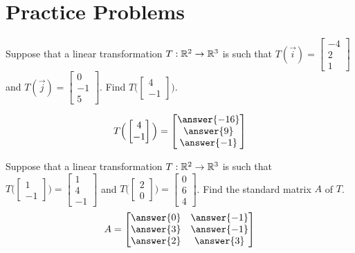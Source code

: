 \documentclass{ximera}
\begin{document}


\section*{Practice Problems}
\begin{problem}\label{prob:evaluateT}
Suppose that a linear transformation $T:\mathbb{R}^2\rightarrow\mathbb{R}^3$ is such that  $T(\vec{i})=\begin{bmatrix}-4\\2\\1\end{bmatrix}$ and $T(\vec{j})=\begin{bmatrix}0\\-1\\5\end{bmatrix}$.  Find $T\Big(\begin{bmatrix}4\\-1\end{bmatrix}\Big)$.

$$T\Big(\begin{bmatrix}4\\-1\end{bmatrix}\Big)=\begin{bmatrix}\answer{-16}\\\answer{9}\\\answer{-1}\end{bmatrix}$$
\end{problem}

\begin{problem}\label{prob:standardmatrix}
Suppose that a linear transformation $T:\mathbb{R}^2\rightarrow\mathbb{R}^3$ is such that  $T\Big(\begin{bmatrix}1\\-1\end{bmatrix}\Big)=\begin{bmatrix}1\\4\\-1\end{bmatrix}$ and $T\Big(\begin{bmatrix}2\\0\end{bmatrix}\Big)=\begin{bmatrix}0\\6\\4\end{bmatrix}$.  Find the standard matrix $A$ of $T$.
$$A=\begin{bmatrix}\answer{0}&\answer{-1}\\\answer{3}&\answer{-1}\\\answer{2}&\answer{3}\end{bmatrix}$$
\end{problem}
\end{document}
